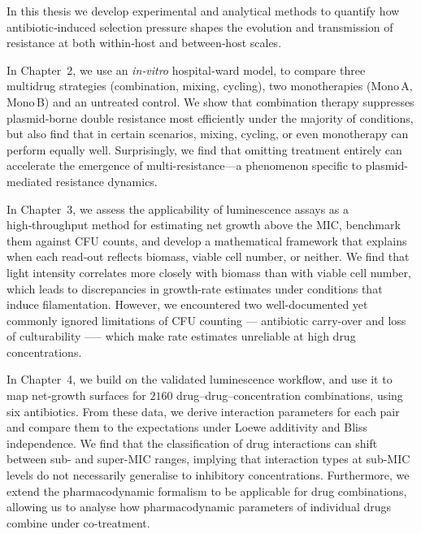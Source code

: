 \documentclass[../main.tex]{subfiles}
\begin{document}
In this thesis we develop experimental and analytical methods to quantify how antibiotic‑induced
selection pressure shapes the evolution and transmission of resistance at both within‑host and between‑host scales.

In Chapter~2, we use an \textit{in‑vitro} hospital‑ward model, to compare three multidrug strategies (combination, mixing, cycling), two monotherapies (Mono A, Mono B) and an untreated control.
We show that combination therapy suppresses plasmid‑borne double resistance most efficiently under the majority of conditions, but also find that in certain scenarios, mixing, cycling, or even monotherapy can perform equally well.
Surprisingly, we find that omitting treatment entirely can accelerate the emergence of multi-resistance—a phenomenon specific to plasmid-mediated resistance dynamics.

In Chapter~3, we assess the applicability of luminescence assays as a high‑throughput method for estimating net growth above the MIC, benchmark them against CFU counts, and develop a mathematical framework that explains when each read‑out reflects biomass, viable cell number, or neither.
We find that light intensity correlates more closely with biomass than with viable cell number, which leads to discrepancies in growth-rate estimates under conditions that induce filamentation.
However, we encountered two well-documented yet commonly ignored limitations of CFU counting --- antibiotic carry-over and loss of culturability --— which make rate estimates unreliable at high drug concentrations.

In Chapter~4, we build on the validated luminescence workflow, and use it to map net‑growth surfaces for $2160$ drug–drug–concentration combinations, using six antibiotics.
From these data, we derive interaction parameters for each pair and compare them to the expectations under Loewe additivity and Bliss independence.
We find that the classification of drug interactions can shift between sub- and super-MIC ranges, implying that interaction types at sub-MIC levels do not necessarily generalise to inhibitory concentrations.
Furthermore, we extend the pharmacodynamic formalism to be applicable for drug combinations, allowing us to analyse how pharmacodynamic parameters of individual drugs combine under co-treatment.

\chapterbibliography
\end{document}
